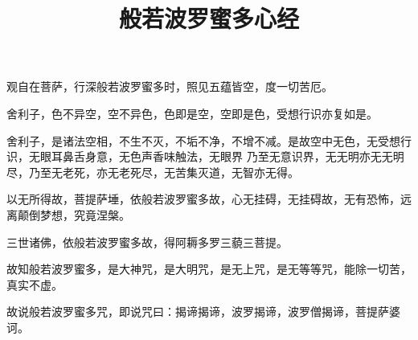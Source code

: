 \documentclass[a4paper]{article}
\title{般若波罗蜜多心经}
\author{}
\date{}
\begin{document}
\maketitle
\vspace{-5em}

\fontsize{14pt}{\baselineskip}\selectfont%
观自在菩萨，行深般若波罗蜜多时，照见五蕴皆空，度一切苦厄。


舍利子，色不异空，空不异色，色即是空，空即是色，受想行识亦复如是。


舍利子，是诸法空相，不生不灭，不垢不净，不增不减。是故空中无色，无受想行识，无眼耳鼻舌身意，无色声香味触法，无眼界 乃至无意识界，无无明亦无无明尽，乃至无老死，亦无老死尽，无苦集灭道，无智亦无得。


以无所得故，菩提萨埵，依般若波罗蜜多故，心无挂碍，无挂碍故，无有恐怖，远离颠倒梦想，究竟涅槃。


三世诸佛，依般若波罗蜜多故，得阿耨多罗三藐三菩提。


故知般若波罗蜜多，是大神咒，是大明咒，是无上咒，是无等等咒，能除一切苦，真实不虚。


故说般若波罗蜜多咒，即说咒曰：揭谛揭谛，波罗揭谛，波罗僧揭谛，菩提萨婆诃。
\end{document}
